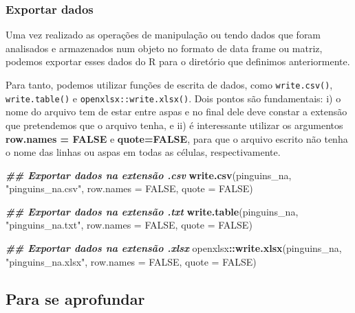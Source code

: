 \documentclass[
]{article}
\newenvironment{Shaded}{\begin{snugshade}}{\end{snugshade}}
\newcommand{\AttributeTok}[1]{\textcolor[rgb]{0.13,0.29,0.53}{#1}}
\newcommand{\ConstantTok}[1]{\textcolor[rgb]{0.56,0.35,0.01}{#1}}
\newcommand{\DocumentationTok}[1]{\textcolor[rgb]{0.56,0.35,0.01}{\textbf{\textit{#1}}}}
\newcommand{\FunctionTok}[1]{\textcolor[rgb]{0.13,0.29,0.53}{\textbf{#1}}}
\newcommand{\NormalTok}[1]{#1}
\newcommand{\SpecialCharTok}[1]{\textcolor[rgb]{0.81,0.36,0.00}{\textbf{#1}}}
\newcommand{\StringTok}[1]{\textcolor[rgb]{0.31,0.60,0.02}{#1}}
\begin{document}
\hypertarget{exportar-dados}{%
\subsubsection{Exportar dados}\label{exportar-dados}}

Uma vez realizado as operações de manipulação ou tendo dados que foram analisados e armazenados num objeto no formato de data frame ou matriz, podemos exportar esses dados do R para o diretório que definimos anteriormente.

Para tanto, podemos utilizar funções de escrita de dados, como \texttt{write.csv()}, \texttt{write.table()} e \texttt{openxlsx::write.xlsx()}. Dois pontos são fundamentais: i) o nome do arquivo tem de estar entre aspas e no final dele deve constar a extensão que pretendemos que o arquivo tenha, e ii) é interessante utilizar os argumentos \textbf{row.names = FALSE} e \textbf{quote=FALSE}, para que o arquivo escrito não tenha o nome das linhas ou aspas em todas as células, respectivamente.

\begin{Shaded}
\begin{Highlighting}[]
\DocumentationTok{\#\# Exportar dados na extensão .csv}
\FunctionTok{write.csv}\NormalTok{(pinguins\_na, }\StringTok{"pinguins\_na.csv"}\NormalTok{, }
          \AttributeTok{row.names =} \ConstantTok{FALSE}\NormalTok{, }\AttributeTok{quote =} \ConstantTok{FALSE}\NormalTok{)}

\DocumentationTok{\#\# Exportar dados na extensão .txt}
\FunctionTok{write.table}\NormalTok{(pinguins\_na, }\StringTok{"pinguins\_na.txt"}\NormalTok{, }
            \AttributeTok{row.names =} \ConstantTok{FALSE}\NormalTok{, }\AttributeTok{quote =} \ConstantTok{FALSE}\NormalTok{)}

\DocumentationTok{\#\# Exportar dados na extensão .xlsx}
\NormalTok{openxlsx}\SpecialCharTok{::}\FunctionTok{write.xlsx}\NormalTok{(pinguins\_na, }\StringTok{"pinguins\_na.xlsx"}\NormalTok{, }
                     \AttributeTok{row.names =} \ConstantTok{FALSE}\NormalTok{, }\AttributeTok{quote =} \ConstantTok{FALSE}\NormalTok{)}
\end{Highlighting}
\end{Shaded}

\hypertarget{para-se-aprofundar}{%
\subsection{Para se aprofundar}\label{para-se-aprofundar}}
\end{document}
